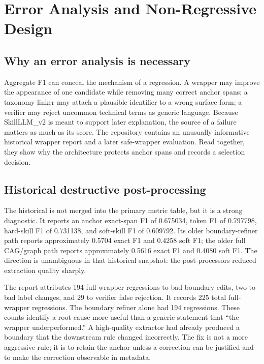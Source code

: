 \chapter{Error Analysis and Non-Regressive Design}
\label{ch:error-analysis}

\section{Why an error analysis is necessary}

Aggregate F1 can conceal the mechanism of a regression. A wrapper may improve the appearance of one candidate while removing many correct anchor spans; a taxonomy linker may attach a plausible identifier to a wrong surface form; a verifier may reject uncommon technical terms as generic language. Because SkillLLM\_v2 is meant to support later explanation, the source of a failure matters as much as its score. The repository contains an unusually informative historical wrapper report and a later safe-wrapper evaluation. Read together, they show why the architecture protects anchor spans and records a selection decision.

\section{Historical destructive post-processing}

The historical  is not merged into the primary metric table, but it is a strong diagnostic. It reports an anchor exact-span F1 of 0.675034, token F1 of 0.797798, hard-skill F1 of 0.731138, and soft-skill F1 of 0.609792. Its older boundary-refiner path reports approximately 0.5704 exact F1 and 0.4258 soft F1; the older full CAG/graph path reports approximately 0.5616 exact F1 and 0.4080 soft F1. The direction is unambiguous in that historical snapshot: the post-processors reduced extraction quality sharply.

The report attributes 194 full-wrapper regressions to bad boundary edits, two to bad label changes, and 29 to verifier false rejection. It records 225 total full-wrapper regressions. The boundary refiner alone had 194 regressions. These counts identify a root cause more useful than a generic statement that ``the wrapper underperformed.'' A high-quality extractor had already produced a boundary that the downstream rule changed incorrectly. The fix is not a more aggressive rule; it is to retain the anchor unless a correction can be justified and to make the correction observable in metadata.


